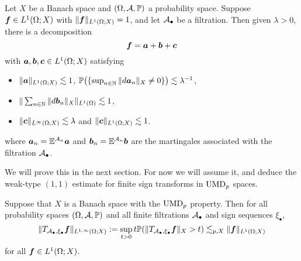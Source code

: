 \begin{thm}\label{thm:gundy}
  Let $X$ be a Banach space and $(\Omega,\mathcal{A},\mathbb{P})$ a probability space.
  Suppose $\bm{f} \in L^1(\Omega;X)$ with $\|\bm{f}\|_{L^1(\Omega;X)} = 1$, and let $\mathcal{A}_{\bullet}$ be a filtration.
  Then given $\lambda > 0$, there is a decomposition
  \begin{equation*}
    \bm{f} = \bm{a} + \bm{b} + \bm{c}
  \end{equation*}
  with $\bm{a}, \bm{b}, \bm{c} \in L^1(\Omega;X)$ satisfying
  \begin{itemize}
  \item $\|\bm{a}\|_{L^{1}(\Omega;X)} \lesssim 1$, $\mathbb{P}\big(\{\sup_{n \in \mathbb{N}} \|d\bm{a}_{n}\|_{X} \neq 0\}\big) \lesssim \lambda^{-1}$,
  \item $\| \sum_{n \in \mathbb{N}} \|d\bm{b}_{n}\|_{X} \|_{L^1(\Omega)} \lesssim 1$,
  \item $\| \bm{c} \|_{L^\infty(\Omega;X)} \lesssim \lambda$ and $\|\bm{c}\|_{L^1(\Omega;X)} \lesssim 1$.
  \end{itemize}
  where $\bm{a}_{n} = \mathbb{E}^{\mathcal{A}_{n}} \bm{a}$ and $\bm{b}_{n} = \mathbb{E}^{\mathcal{A}_{n}} \bm{b}$ are the martingales associated with the filtration $\mathcal{A}_{\bullet}$.
\end{thm}

We will prove this in the next section.
For now we will assume it, and deduce the weak-type $(1,1)$ estimate for finite sign transforms in $\mathrm{UMD}_{p}$ spaces.

\begin{prop}\label{prop:martingale-w11}
  Suppose that $X$ is a Banach space with the $\mathrm{UMD}_{p}$ property.
  Then for all probability spaces $(\Omega,\mathcal{A},\mathbb{P})$ and all finite filtrations $\mathcal{A}_{\bullet}$ and sign sequences $\xi_{\bullet}$,
  \begin{equation*}
    \|T_{\mathcal{A}_{\bullet}, \xi_{\bullet}} \bm{f}\|_{L^{1,\infty}(\Omega;X)} := \sup_{t > 0} t\mathbb{P}(\|T_{\mathcal{A}_{\bullet}, \xi_{\bullet}} \bm{f}\|_{X} > t) \lesssim_{p,X} \|\bm{f}\|_{L^1(\Omega;X)}
  \end{equation*}
  for all $\bm{f} \in L^1(\Omega;X)$.
\end{prop}

